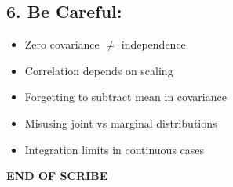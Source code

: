 \documentclass[11pt]{article}
\begin{document}
\subsection*{6. Be Careful:}
\begin{itemize}
    \item Zero covariance $\neq$ independence
    \item Correlation depends on scaling
    \item Forgetting to subtract mean in covariance
    \item Misusing joint vs marginal distributions
    \item Integration limits in continuous cases
\end{itemize}

\begin{center}
\textbf{END OF SCRIBE}
\end{center}
\end{document}
